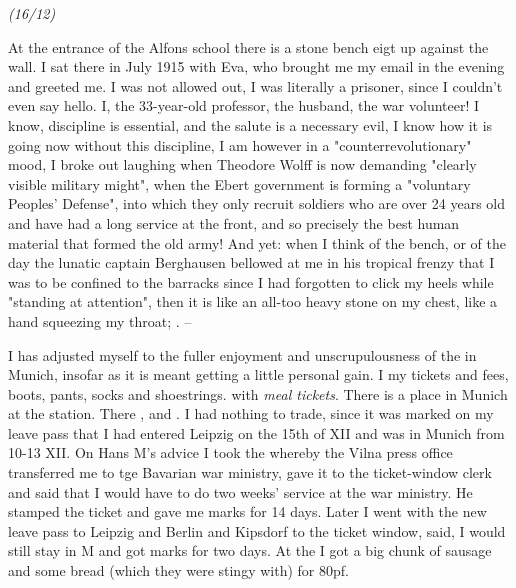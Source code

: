 \textit{(16/12)}

At the entrance of the Alfons school there is a stone bench eigt up against the wall. I sat there in July 1915  with Eva, who brought me my email in the evening and greeted me. I was not allowed out, I was literally a prisoner, since I couldn't even say hello. I, the 33-year-old professor, the husband, the war volunteer! I know, discipline is essential, and the salute is a necessary evil, I know how it is going now without this discipline, I am however in a "counterrevolutionary" mood, I broke out laughing when Theodore Wolff is now demanding "clearly visible military might", when the Ebert government is forming a "voluntary Peoples' Defense", into which they only recruit soldiers who are over 24 years old and have had a long service at the front, and so precisely the best human material that formed the old army! And yet: when I think of the bench, or of the day the lunatic captain Berghausen bellowed at me in his tropical frenzy that I was to be confined to the barracks since I had forgotten to click my heels while "standing at attention", then it is like an all-too heavy stone on my chest, like a hand squeezing my throat; . --

I has adjusted myself to the fuller enjoyment and unscrupulousness of the  in Munich, insofar as it is meant getting a little personal gain. I  my tickets and fees, boots, pants, socks and shoestrings.  with \textit{meal tickets}. There is a place in Munich at the station. There , and . I had nothing to trade, since it was marked on my leave pass that I had entered Leipzig on the 15th of XII and was in Munich from 10-13 XII. On Hans M's advice I took the  whereby the Vilna press office transferred me to tge Bavarian war ministry, gave it to the ticket-window clerk and said that I would have to do two weeks' service at the war ministry. He stamped the ticket and gave me marks for 14 days. Later I went with the new leave pass to Leipzig and Berlin and Kipsdorf to the ticket window, said, I would still stay in M and got marks for two days. At the  I got a big chunk of sausage and some bread (which they were stingy with) for 80pf.

